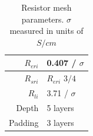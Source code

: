 \documentclass[journal, a4paper]{IEEEtran}
\begin{document}
\begin{table}
    \begin{center}
        \begin{tabular}{|r|l|}
            \hline
            $R_{eri}$ & 0.407 / $\sigma$ \\ \hline
            $R_{sri}$ & $R_{eri}$ $3/4$ \\ \hline
            $R_{li}$ & 3.71 / $\sigma$ \\ \hline
            Depth & 5 layers \\ \hline
            Padding & 3 layers \\ \hline
        \end{tabular}
    \end{center}
    \caption{Resistor mesh parameters. $\sigma$ measured in units of $S/cm$}
    \label{tab:RESparams}
\end{table}

\pagebreak
\end{document}
